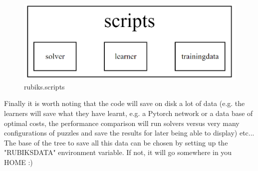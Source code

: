\begin{figure}[H]
\centering
\includegraphics[scale=0.25]{./Figures/codebasescripts}
\caption[Codebase]{rubiks.scripts}
\label{fig:Codebasescripts}
\end{figure}

Finally it is worth noting that the code will save on disk a lot of data (e.g. the learners will save what they have learnt, e.g. a Pytorch network or a data base of optimal costs, the performance comparison will run solvers versus very many configurations of puzzles and save the results for later being able to display) etc... The base of the tree to save all this data can be chosen by setting up the "RUBIKSDATA" environment variable. If not, it will go somewhere in you HOME :)
